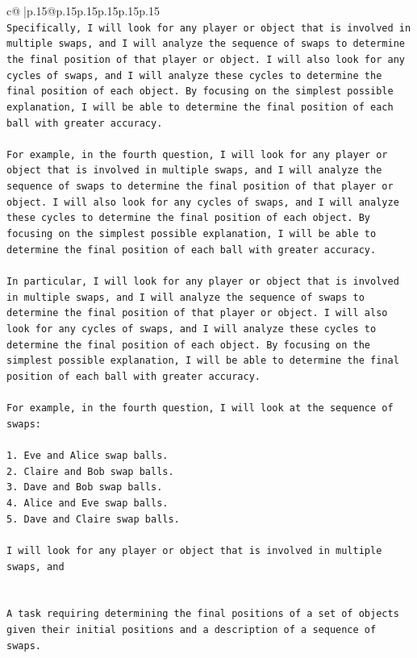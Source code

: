 \documentclass{article}
\begin{document}
{\begin{supertabular}{c@{$\;$}|p{.15\linewidth}@{}p{.15\linewidth}p{.15\linewidth}p{.15\linewidth}p{.15\linewidth}p{.15\linewidth}}
{{{\\ 
\texttt{Specifically, I will look for any player or object that is involved in multiple swaps, and I will analyze the sequence of swaps to determine the final position of that player or object. I will also look for any cycles of swaps, and I will analyze these cycles to determine the final position of each object. By focusing on the simplest possible explanation, I will be able to determine the final position of each ball with greater accuracy.} \\
\\ 
\texttt{For example, in the fourth question, I will look for any player or object that is involved in multiple swaps, and I will analyze the sequence of swaps to determine the final position of that player or object. I will also look for any cycles of swaps, and I will analyze these cycles to determine the final position of each object. By focusing on the simplest possible explanation, I will be able to determine the final position of each ball with greater accuracy.} \\
\\ 
\texttt{In particular, I will look for any player or object that is involved in multiple swaps, and I will analyze the sequence of swaps to determine the final position of that player or object. I will also look for any cycles of swaps, and I will analyze these cycles to determine the final position of each object. By focusing on the simplest possible explanation, I will be able to determine the final position of each ball with greater accuracy.} \\
\\ 
\texttt{For example, in the fourth question, I will look at the sequence of swaps:} \\
\\ 
\texttt{1. Eve and Alice swap balls.} \\
\texttt{2. Claire and Bob swap balls.} \\
\texttt{3. Dave and Bob swap balls.} \\
\texttt{4. Alice and Eve swap balls.} \\
\texttt{5. Dave and Claire swap balls.} \\
\\ 
\texttt{I will look for any player or object that is involved in multiple swaps, and} \\
\\ 
\\ 
\texttt{A task requiring determining the final positions of a set of objects given their initial positions and a description of a sequence of swaps.} \\
}}}
\end{supertabular}}
\end{document}
